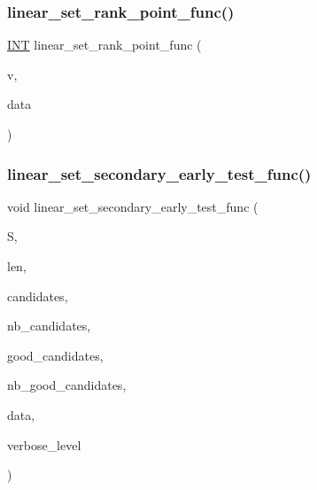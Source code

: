 \mbox{\label{linear__set_8_c_aa42403726dcde3a558a8c89a3c34d63e}} 
\subsubsection{\texorpdfstring{linear\+\_\+set\+\_\+rank\+\_\+point\+\_\+func()}{linear\_set\_rank\_point\_func()}}
{\footnotesize\ttfamily \mbox{\hyperlink{galois_8h_a09fddde158a3a20bd2dcadb609de11dc}{I\+NT}} linear\+\_\+set\+\_\+rank\+\_\+point\+\_\+func (\begin{DoxyParamCaption}\item[{\mbox{\hyperlink{galois_8h_a09fddde158a3a20bd2dcadb609de11dc}{I\+NT}} $\ast$}]{v,  }\item[{void $\ast$}]{data }\end{DoxyParamCaption})}

\mbox{\label{linear__set_8_c_a18952a27859ea38d664fcaa5eda899d3}} 
\subsubsection{\texorpdfstring{linear\+\_\+set\+\_\+secondary\+\_\+early\+\_\+test\+\_\+func()}{linear\_set\_secondary\_early\_test\_func()}}
{\footnotesize\ttfamily void linear\+\_\+set\+\_\+secondary\+\_\+early\+\_\+test\+\_\+func (\begin{DoxyParamCaption}\item[{\mbox{\hyperlink{galois_8h_a09fddde158a3a20bd2dcadb609de11dc}{I\+NT}} $\ast$}]{S,  }\item[{\mbox{\hyperlink{galois_8h_a09fddde158a3a20bd2dcadb609de11dc}{I\+NT}}}]{len,  }\item[{\mbox{\hyperlink{galois_8h_a09fddde158a3a20bd2dcadb609de11dc}{I\+NT}} $\ast$}]{candidates,  }\item[{\mbox{\hyperlink{galois_8h_a09fddde158a3a20bd2dcadb609de11dc}{I\+NT}}}]{nb\+\_\+candidates,  }\item[{\mbox{\hyperlink{galois_8h_a09fddde158a3a20bd2dcadb609de11dc}{I\+NT}} $\ast$}]{good\+\_\+candidates,  }\item[{\mbox{\hyperlink{galois_8h_a09fddde158a3a20bd2dcadb609de11dc}{I\+NT}} \&}]{nb\+\_\+good\+\_\+candidates,  }\item[{void $\ast$}]{data,  }\item[{\mbox{\hyperlink{galois_8h_a09fddde158a3a20bd2dcadb609de11dc}{I\+NT}}}]{verbose\+\_\+level }\end{DoxyParamCaption})}

